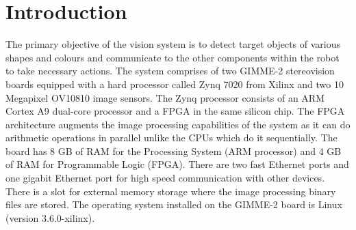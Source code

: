 \section{Introduction}\label{sec:introduction}
The primary objective of the vision system is to detect target objects of various shapes and colours and communicate to the other components within the robot to take necessary actions. The system comprises of two GIMME-2 stereovision boards equipped with a hard processor \cite{hardp} called Zynq 7020 from Xilinx and two 10 Megapixel OV10810 image sensors. The Zynq processor consists of an ARM Cortex A9 dual-core processor and a FPGA in the same silicon chip. The FPGA architecture augments the image processing capabilities of the system as it can do arithmetic operations in parallel unlike the CPUs which do it sequentially. The board has 8 GB of RAM for the Processing System (ARM processor) and 4 GB of RAM for Programmable Logic (FPGA). There are two fast Ethernet ports and one gigabit Ethernet port for high speed communication with other devices. There is a slot for external memory storage where the image processing binary files are stored. The operating system installed on the GIMME-2 board is Linux (version 3.6.0-xilinx). 

